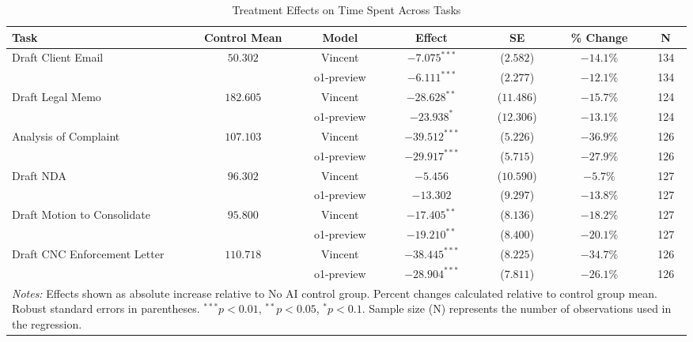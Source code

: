 \begin{table}[!htbp]
\centering
\caption{Treatment Effects on Time Spent Across Tasks}
\label{tab:time_spent_effects}
\begin{tabular}{lcccccc}
\hline\hline
Task & Control Mean & Model & Effect & SE & \% Change & N \\
\hline
\multirow{2}{*}{Draft Client Email} & \multirow{2}{*}{$50.302$} & Vincent & $-7.075^{***}$ & ($2.582$) & $-14.1\%$ & 134 \\
& & o1-preview & $-6.111^{***}$ & ($2.277$) & $-12.1\%$ & 134 \\
\hline
\multirow{2}{*}{Draft Legal Memo} & \multirow{2}{*}{$182.605$} & Vincent & $-28.628^{**}$ & ($11.486$) & $-15.7\%$ & 124 \\
& & o1-preview & $-23.938^{*}$ & ($12.306$) & $-13.1\%$ & 124 \\
\hline
\multirow{2}{*}{Analysis of Complaint} & \multirow{2}{*}{$107.103$} & Vincent & $-39.512^{***}$ & ($5.226$) & $-36.9\%$ & 126 \\
& & o1-preview & $-29.917^{***}$ & ($5.715$) & $-27.9\%$ & 126 \\
\hline
\multirow{2}{*}{Draft NDA} & \multirow{2}{*}{$96.302$} & Vincent & $-5.456$ & ($10.590$) & $-5.7\%$ & 127 \\
& & o1-preview & $-13.302$ & ($9.297$) & $-13.8\%$ & 127 \\
\hline
\multirow{2}{*}{Draft Motion to Consolidate} & \multirow{2}{*}{$95.800$} & Vincent & $-17.405^{**}$ & ($8.136$) & $-18.2\%$ & 127 \\
& & o1-preview & $-19.210^{**}$ & ($8.400$) & $-20.1\%$ & 127 \\
\hline
\multirow{2}{*}{Draft CNC Enforcement Letter} & \multirow{2}{*}{$110.718$} & Vincent & $-38.445^{***}$ & ($8.225$) & $-34.7\%$ & 126 \\
& & o1-preview & $-28.904^{***}$ & ($7.811$) & $-26.1\%$ & 126 \\
\hline
\multicolumn{7}{p{0.95\linewidth}}{\footnotesize \textit{Notes:} Effects shown as absolute increase relative to No AI control group. Percent changes calculated relative to control group mean. Robust standard errors in parentheses. $^{***}p<0.01$, $^{**}p<0.05$, $^{*}p<0.1$. Sample size (N) represents the number of observations used in the regression.}
\end{tabular}
\end{table}